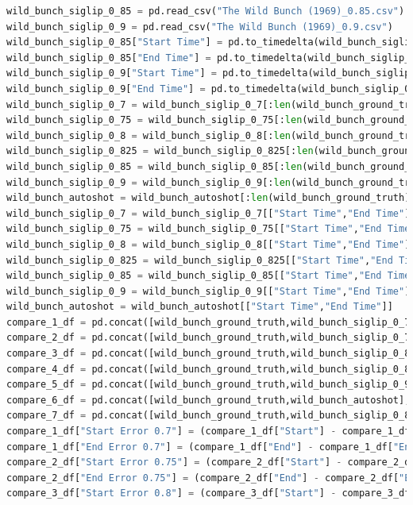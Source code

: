 \documentclass[12pt]{report}
\begin{document}
\begin{lstlisting}[language=Python,caption={Analysis Code}]
wild_bunch_siglip_0_85 = pd.read_csv("The Wild Bunch (1969)_0.85.csv")
wild_bunch_siglip_0_9 = pd.read_csv("The Wild Bunch (1969)_0.9.csv")
wild_bunch_siglip_0_85["Start Time"] = pd.to_timedelta(wild_bunch_siglip_0_85["Start Time"]).dt.total_seconds()
wild_bunch_siglip_0_85["End Time"] = pd.to_timedelta(wild_bunch_siglip_0_85["End Time"]).dt.total_seconds()
wild_bunch_siglip_0_9["Start Time"] = pd.to_timedelta(wild_bunch_siglip_0_9["Start Time"]).dt.total_seconds()
wild_bunch_siglip_0_9["End Time"] = pd.to_timedelta(wild_bunch_siglip_0_9["End Time"]).dt.total_seconds()
wild_bunch_siglip_0_7 = wild_bunch_siglip_0_7[:len(wild_bunch_ground_truth)]
wild_bunch_siglip_0_75 = wild_bunch_siglip_0_75[:len(wild_bunch_ground_truth)]
wild_bunch_siglip_0_8 = wild_bunch_siglip_0_8[:len(wild_bunch_ground_truth)]
wild_bunch_siglip_0_825 = wild_bunch_siglip_0_825[:len(wild_bunch_ground_truth)]
wild_bunch_siglip_0_85 = wild_bunch_siglip_0_85[:len(wild_bunch_ground_truth)]
wild_bunch_siglip_0_9 = wild_bunch_siglip_0_9[:len(wild_bunch_ground_truth)]
wild_bunch_autoshot = wild_bunch_autoshot[:len(wild_bunch_ground_truth)]
wild_bunch_siglip_0_7 = wild_bunch_siglip_0_7[["Start Time","End Time"]]
wild_bunch_siglip_0_75 = wild_bunch_siglip_0_75[["Start Time","End Time"]]
wild_bunch_siglip_0_8 = wild_bunch_siglip_0_8[["Start Time","End Time"]]
wild_bunch_siglip_0_825 = wild_bunch_siglip_0_825[["Start Time","End Time"]]
wild_bunch_siglip_0_85 = wild_bunch_siglip_0_85[["Start Time","End Time"]]
wild_bunch_siglip_0_9 = wild_bunch_siglip_0_9[["Start Time","End Time"]]
wild_bunch_autoshot = wild_bunch_autoshot[["Start Time","End Time"]]
compare_1_df = pd.concat([wild_bunch_ground_truth,wild_bunch_siglip_0_7], axis=1)
compare_2_df = pd.concat([wild_bunch_ground_truth,wild_bunch_siglip_0_75], axis=1)
compare_3_df = pd.concat([wild_bunch_ground_truth,wild_bunch_siglip_0_8], axis=1)
compare_4_df = pd.concat([wild_bunch_ground_truth,wild_bunch_siglip_0_85], axis=1)
compare_5_df = pd.concat([wild_bunch_ground_truth,wild_bunch_siglip_0_9], axis=1)
compare_6_df = pd.concat([wild_bunch_ground_truth,wild_bunch_autoshot], axis=1)
compare_7_df = pd.concat([wild_bunch_ground_truth,wild_bunch_siglip_0_825], axis=1)
compare_1_df["Start Error 0.7"] = (compare_1_df["Start"] - compare_1_df["Start Time"]).abs()
compare_1_df["End Error 0.7"] = (compare_1_df["End"] - compare_1_df["End Time"]).abs()
compare_2_df["Start Error 0.75"] = (compare_2_df["Start"] - compare_2_df["Start Time"]).abs()
compare_2_df["End Error 0.75"] = (compare_2_df["End"] - compare_2_df["End Time"]).abs()
compare_3_df["Start Error 0.8"] = (compare_3_df["Start"] - compare_3_df["Start Time"]).abs()

\end{lstlisting}
\end{document}
